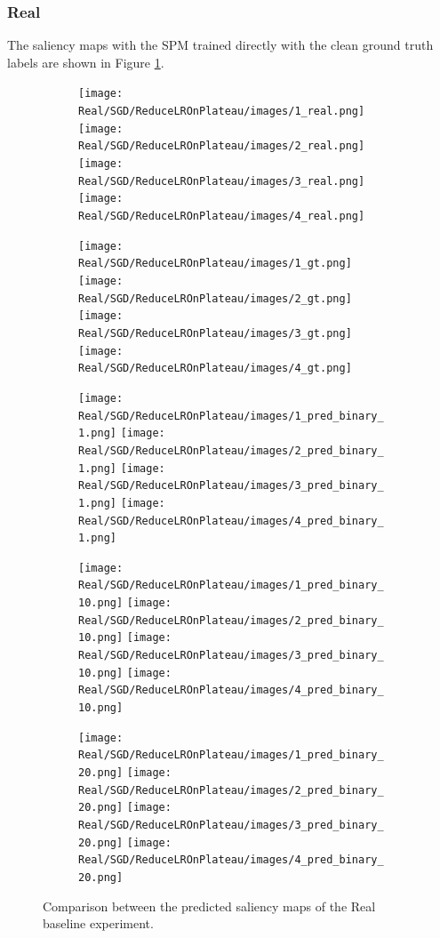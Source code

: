 \documentclass{article}
\begin{document}
\subsubsection{Real}

The saliency maps with the SPM trained directly with the clean ground truth labels are shown in Figure \ref{fig:real_sm}.

\begin{figure}[p]
  \centering
  \begin{subfigure}[c]{0.19\textwidth}
    \centering
      \texttt{[image: Real/SGD/ReduceLROnPlateau/images/1\_real.png]}
      \texttt{[image: Real/SGD/ReduceLROnPlateau/images/2\_real.png]}
      \texttt{[image: Real/SGD/ReduceLROnPlateau/images/3\_real.png]}
      \texttt{[image: Real/SGD/ReduceLROnPlateau/images/4\_real.png]}
  \end{subfigure}
  \begin{subfigure}[c]{0.19\textwidth}
    \centering
      \texttt{[image: Real/SGD/ReduceLROnPlateau/images/1\_gt.png]}
      \texttt{[image: Real/SGD/ReduceLROnPlateau/images/2\_gt.png]}
      \texttt{[image: Real/SGD/ReduceLROnPlateau/images/3\_gt.png]}
      \texttt{[image: Real/SGD/ReduceLROnPlateau/images/4\_gt.png]}
  \end{subfigure}
  \begin{subfigure}[c]{0.19\textwidth}
    \centering
    \texttt{[image: Real/SGD/ReduceLROnPlateau/images/1\_pred\_binary\_1.png]}
    \texttt{[image: Real/SGD/ReduceLROnPlateau/images/2\_pred\_binary\_1.png]}
    \texttt{[image: Real/SGD/ReduceLROnPlateau/images/3\_pred\_binary\_1.png]}
    \texttt{[image: Real/SGD/ReduceLROnPlateau/images/4\_pred\_binary\_1.png]}
  \end{subfigure}
  \begin{subfigure}[c]{0.19\textwidth}
    \centering
    \texttt{[image: Real/SGD/ReduceLROnPlateau/images/1\_pred\_binary\_10.png]}
    \texttt{[image: Real/SGD/ReduceLROnPlateau/images/2\_pred\_binary\_10.png]}
    \texttt{[image: Real/SGD/ReduceLROnPlateau/images/3\_pred\_binary\_10.png]}
    \texttt{[image: Real/SGD/ReduceLROnPlateau/images/4\_pred\_binary\_10.png]}
  \end{subfigure}
  \begin{subfigure}[c]{0.19\textwidth}
    \centering
    \texttt{[image: Real/SGD/ReduceLROnPlateau/images/1\_pred\_binary\_20.png]}
    \texttt{[image: Real/SGD/ReduceLROnPlateau/images/2\_pred\_binary\_20.png]}
    \texttt{[image: Real/SGD/ReduceLROnPlateau/images/3\_pred\_binary\_20.png]}
    \texttt{[image: Real/SGD/ReduceLROnPlateau/images/4\_pred\_binary\_20.png]}
  \end{subfigure}
  \caption{Comparison between the predicted saliency maps of the Real baseline experiment.}
  \label{fig:real_sm}
\end{figure}
\end{document}
